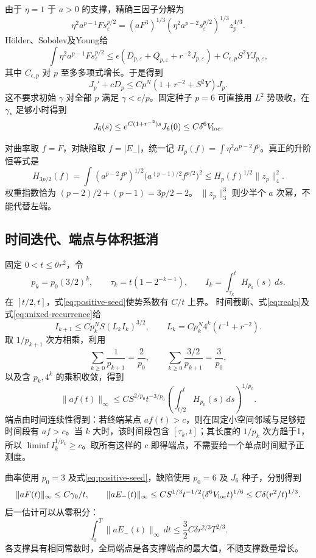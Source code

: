 \documentclass[UTF8,a4paper,11pt,fontset=fandol]{ctexart}
\numberwithin{equation}{section}
\theoremstyle{definition}
\begin{document}
由于 $\eta=1$ 于 $a>0$ 的支撑，精确三因子分解为
\[
\eta^2a^{p-1}F s_\varepsilon^{p/2}
=(aF^3)^{1/3}
(\eta^2a^{p-2}s_\varepsilon^{p/2})^{1/3}z_p^{4/3}.
\]
H\"older、Sobolev及Young给
\[
\int\eta^2a^{p-1}F s_\varepsilon^{p/2}
\le\epsilon(D_{p,\varepsilon}+Q_{p,\varepsilon}+r^{-2}J_{p,\varepsilon})
+C_{\epsilon,p}S^2YJ_{p,\varepsilon},
\]
其中 $C_{\epsilon,p}$ 对 $p$ 至多多项式增长。于是得到
\begin{equation}\label{eq:realp}
J_p'+cD_p\le Cp^N(1+r^{-2}+S^2Y)J_p.
\end{equation}
这不要求初始 $\gamma$ 对全部 $p$ 满足 $\gamma<c/p$。固定种子 $p=6$ 可直接用 $L^2$ 势吸收，在 $\gamma_*$ 足够小时得到
\[
J_6(s)\le e^{C(1+r^{-2})s}J_6(0)
\le C\delta^6V_{\rm loc}.
\]

对曲率取 $f=F$，对缺陷取 $f=|E_-|$，统一记
$H_p(f)=\int\eta^2a^{p-2}f^p$。真正的升阶恒等式是
\begin{equation}\label{eq:mixed-recurrence}
H_{3p/2}(f)
=\int(a^{p-2}f^p)^{1/2}
\bigl(a^{(p-1)/2}f^{p/2}\bigr)^2
\le H_p(f)^{1/2}\|z_p\|_4^2.
\end{equation}
权重指数恰为 $(p-2)/2+(p-1)=3p/2-2$。
$\|z_p\|_3^3$ 则少半个 $a$ 次幂，不能代替左端。

\subsection{时间迭代、端点与体积抵消}
固定 $0<t\le\theta r^2$，令
\[
p_k=p_0(3/2)^k,\qquad
\tau_k=t(1-2^{-k-1}),\qquad
I_k=\int_{\tau_k}^{t}H_{p_k}(s)\,ds.
\]
在 $[t/2,t]$，式\eqref{eq:positive-seed}使势系数有 $C/t$ 上界。
时间截断、式\eqref{eq:realp}及式\eqref{eq:mixed-recurrence}给
\[
I_{k+1}\le Cp_k^N S(L_kI_k)^{3/2},\qquad
L_k=Cp_k^N4^k(t^{-1}+r^{-2}).
\]
取 $1/p_{k+1}$ 次方相乘，利用
\[
\sum_{k\ge0}\frac1{p_{k+1}}=\frac2{p_0},\qquad
\sum_{k\ge0}\frac{3/2}{p_{k+1}}=\frac3{p_0},
\]
以及含 $p_k,4^k$ 的乘积收敛，得到
\begin{equation}\label{eq:weighted-endpoint}
\|af(t)\|_\infty
\le CS^{2/p_0}t^{-3/p_0}
\left(\int_{t/2}^{t}H_{p_0}(s)\,ds\right)^{1/p_0}.
\end{equation}
端点由时间连续性得到：若终端某点 $af(t)>c$，则在固定小空间邻域与足够短时间段有 $af>c$。当 $k$ 大时，该时间段包含 $[\tau_k,t]$；其长度的 $1/p_k$ 次方趋于1，所以 $\liminf I_k^{1/p_k}\ge c$。取所有这样的 $c$ 即得端点，不需要给一个单点时间赋予正测度。

曲率使用 $p_0=3$ 及式\eqref{eq:positive-seed}，缺陷使用 $p_0=6$ 及 $J_6$ 种子，分别得到
\[
\|aF(t)\|_\infty\le C\gamma_0/t,\qquad
\|aE_-(t)\|_\infty
\le CS^{1/3}t^{-1/2}(\delta^6V_{\rm loc}t)^{1/6}
\le C\delta(r^2/t)^{1/3}.
\]
后一估计可以从零积分：
\[
\int_0^T\|aE_-(t)\|_\infty\,dt
\le\frac32C\delta r^{2/3}T^{2/3}.
\]
各支撑具有相同常数时，全局端点是各支撑端点的最大值，不随支撑数量增长。
\end{document}
